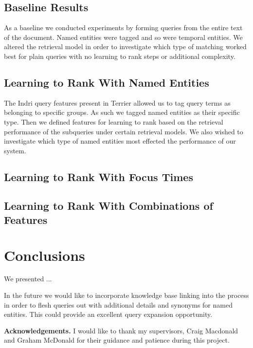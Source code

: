 \documentclass{mpaper}
\begin{document}
\subsection{Baseline Results}
As a baseline we conducted experiments by forming queries from the entire text of the document.
Named entities were tagged and so were temporal entities.
We altered the retrieval model in order to investigate which type of matching worked best for plain queries with no learning to rank steps or additional complexity.

\subsection{Learning to Rank With Named Entities}
The Indri query features present in Terrier allowed us to tag query terms as belonging to specific groups. As such we tagged named entities as their specific type.
Then we defined features for learning to rank based on the retrieval performance of the subqueries under certain retrieval models.
We also wished to investigate which type of named entities most effected the performance of our system.

\subsection{Learning to Rank With Focus Times}

\subsection{Learning to Rank With Combinations of Features}

\section{Conclusions} \label{sec:conclusion}
We presented ...


In the future we would like to incorporate knowledge base linking into the process in order to flesh queries out with additional details and synonyms for named entities. This could provide an excellent query expansion opportunity.

\vskip8pt \noindent
{\bf Acknowledgements.}
I would like to thank my supervisors, Craig Macdonald and Graham McDonald for their guidance and patience during this project.


\end{document}
